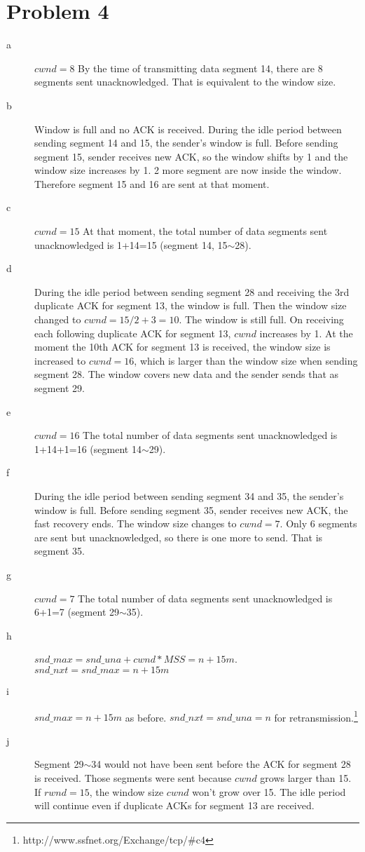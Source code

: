 \documentclass[a4paper]{article}
\begin{document}
\section{Problem 4} %
\label{sec:problem_4}
\begin{description}
	\item[a] $cwnd=8$ By the time of transmitting data segment 14, there are 8 segments sent unacknowledged. That is equivalent to the window size.
	\item[b] Window is full and no ACK is received. During the idle period between sending segment 14 and 15, the sender's window is full. Before sending segment 15, sender receives new ACK, so the window shifts by 1 and the window size increases by 1. 2 more segment are now inside the window. Therefore segment 15 and 16 are sent at that moment.
	\item[c] $cwnd=15$ At that moment, the total number of data segments sent unacknowledged is 1+14=15 (segment 14, 15$\sim$28).
	\item[d] During the idle period between sending segment 28 and receiving the 3rd duplicate ACK for segment 13, the window is full. Then the window size changed to $cwnd=15/2+3=10$. The window is still full. On receiving each following duplicate ACK for segment 13, $cwnd$ increases by 1. At the moment the 10th ACK for segment 13 is received, the window size is increased to $cwnd=16$, which is larger than the window size when sending segment 28. The window covers new data and the sender sends that as segment 29.
	\item[e] $cwnd=16$ The total number of data segments sent unacknowledged is 1+14+1=16 (segment 14$\sim$29).
	\item[f] During the idle period between sending segment 34 and 35, the sender's window is full. Before sending segment 35, sender receives new ACK, the fast recovery ends. The window size changes to $cwnd=7$. Only 6 segments are sent but unacknowledged, so there is one more to send. That is segment 35.
	\item[g] $cwnd=7$ The total number of data segments sent unacknowledged is 6+1=7 (segment 29$\sim$35).
	\item[h] $snd\_max=snd\_una+cwnd*MSS=n+15m$. $snd\_nxt=snd\_max=n+15m$
	\item[i] $snd\_max=n+15m$ as before. $snd\_nxt=snd\_una=n$ for retransmission.\footnote{http://www.ssfnet.org/Exchange/tcp/\#c4}
	\item[j] Segment 29$\sim$34 would not have been sent before the ACK for segment 28 is received. Those segments were sent because $cwnd$ grows larger than 15. If $rwnd=15$, the window size $cwnd$ won't grow over 15. The idle period will continue even if duplicate ACKs for segment 13 are received.\\

\end{description}
\end{document}
